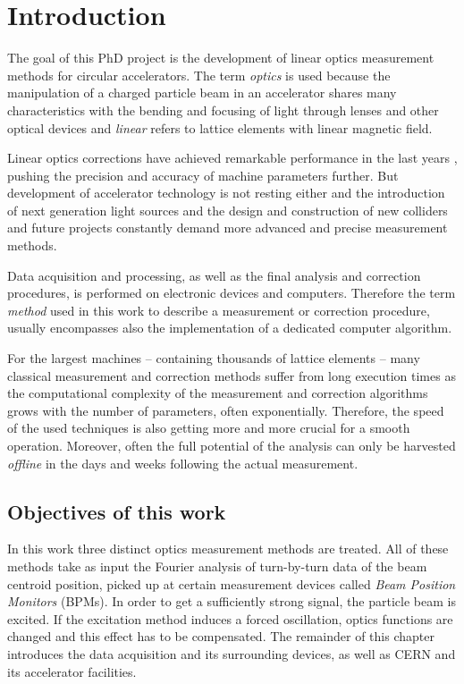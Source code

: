 \chapter{Introduction}

\lohead{\leftmark}
\rehead{\rightmark}
\setcounter{page}{1}


The goal of this PhD project is the development of linear optics measurement methods for
circular accelerators.
The term \emph{optics} is used because the manipulation of a charged particle beam in an accelerator shares
many characteristics with the bending and focusing of light through lenses and other optical
devices and \emph{linear} refers to lattice elements with linear magnetic field.

Linear optics corrections have achieved remarkable performance in the last years %
\cite{Tomas2017, Tomas2012, Persson2017, Aiba2013, Sagan2000, Borer1983, Langner2015},
pushing the precision and accuracy of machine parameters further.
But development of accelerator technology is not resting either and the introduction of
next generation light sources and the design and construction of new colliders and future projects
constantly demand more advanced and precise measurement methods.

Data acquisition and processing, as well as the final analysis and correction procedures, is performed on
electronic devices and computers. Therefore the term \emph{method} used in this work to describe
a measurement or correction procedure, usually encompasses also the implementation of a dedicated computer algorithm.

For the largest machines -- containing thousands of lattice elements -- many classical measurement and
correction methods suffer from long execution times as the computational complexity of the measurement
and correction algorithms grows with the number of parameters, often exponentially. 
Therefore, the speed of the used techniques is also getting more and more crucial for a smooth operation. 
Moreover, often the full potential of the analysis can only be harvested \emph{offline} in the days and
weeks following the actual measurement.

\section{Objectives of this work}

In this work three distinct optics measurement methods are treated. All of these methods take as input the
Fourier analysis of turn-by-turn data of the beam centroid position, picked up at certain measurement
devices called \emph{Beam Position Monitors} (BPMs). In order to get a sufficiently strong signal, the
particle beam is excited. If the excitation method induces a forced oscillation, optics functions are changed
and this effect has to be compensated.
The remainder of this chapter introduces the data acquisition and its surrounding devices, as well as
CERN and its accelerator facilities.

